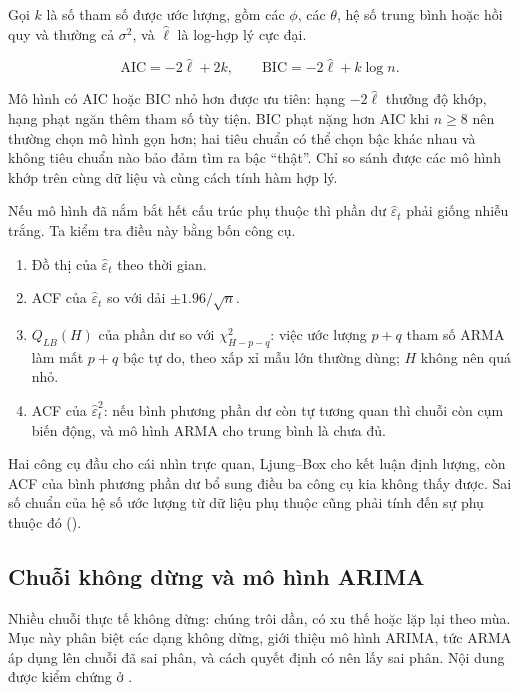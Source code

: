Gọi $k$ là số tham số được ước lượng, gồm các $\phi$, các $\theta$, hệ số trung bình hoặc hồi quy và thường cả $\sigma^2$, và $\hat\ell$ là log-hợp lý cực đại.
\begin{kq}
\[
\mathrm{AIC}=-2\hat\ell+2k,\qquad \mathrm{BIC}=-2\hat\ell+k\log n.
\]
\end{kq}
Mô hình có AIC hoặc BIC nhỏ hơn được ưu tiên: hạng $-2\hat\ell$ thưởng độ khớp, hạng phạt ngăn thêm tham số tùy tiện. BIC phạt nặng hơn AIC khi $n\ge8$ nên thường chọn mô hình gọn hơn; hai tiêu chuẩn có thể chọn bậc khác nhau và không tiêu chuẩn nào bảo đảm tìm ra bậc ``thật''. Chỉ so sánh được các mô hình khớp trên cùng dữ liệu và cùng cách tính hàm hợp lý.

Nếu mô hình đã nắm bắt hết cấu trúc phụ thuộc thì phần dư $\hat\varepsilon_t$ phải giống nhiễu trắng. Ta kiểm tra điều này bằng bốn công cụ.
\begin{kq}
\begin{enumerate}[label=(\roman*),leftmargin=*,itemsep=1pt]
\item Đồ thị của $\hat\varepsilon_t$ theo thời gian.
\item ACF của $\hat\varepsilon_t$ so với dải $\pm1.96/\sqrt n$.
\item $Q_{LB}(H)$ của phần dư so với $\chi^2_{H-p-q}$: việc ước lượng $p+q$ tham số ARMA làm mất $p+q$ bậc tự do, theo xấp xỉ mẫu lớn thường dùng; $H$ không nên quá nhỏ.
\item ACF của $\hat\varepsilon_t^2$: nếu bình phương phần dư còn tự tương quan thì chuỗi còn cụm biến động, và mô hình ARMA cho trung bình là chưa đủ.
\end{enumerate}
\end{kq}
Hai công cụ đầu cho cái nhìn trực quan, Ljung--Box cho kết luận định lượng, còn ACF của bình phương phần dư bổ sung điều ba công cụ kia không thấy được. Sai số chuẩn của hệ số ước lượng từ dữ liệu phụ thuộc cũng phải tính đến sự phụ thuộc đó ().

\subsection{Chuỗi không dừng và mô hình ARIMA}

Nhiều chuỗi thực tế không dừng: chúng trôi dần, có xu thế hoặc lặp lại theo mùa. Mục này phân biệt các dạng không dừng, giới thiệu mô hình ARIMA, tức ARMA áp dụng lên chuỗi đã sai phân, và cách quyết định có nên lấy sai phân. Nội dung được kiểm chứng ở .

